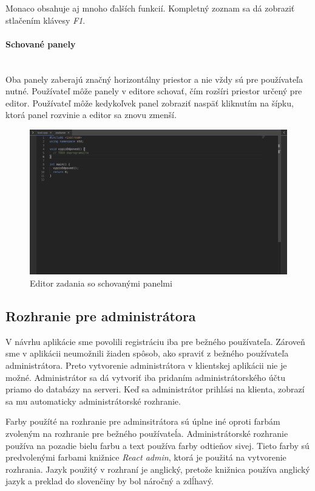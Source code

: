Monaco obsahuje aj mnoho ďalších funkcií. Kompletný zoznam sa dá zobraziť stlačením klávesy
\textit{F1}. 

\paragraph{Schované panely}\leavevmode\\
Oba panely zaberajú značný horizontálny priestor a nie vždy sú pre používateľa nutné. Používateľ
môže panely v editore schovať, čím rozšíri priestor určený pre editor. Používateľ môže kedykoľvek
panel zobraziť naspäť kliknutím na šípku, ktorá panel rozvinie a editor sa znovu zmenší. 
\begin{figure}[H]
\centerline{\includegraphics[width=1\textwidth]{images/zcucnute_panely}}
\caption[Editor zadania so schovanými panelmi]{Editor zadania so schovanými panelmi}
\label{obr:zcucnute_panely}
\end{figure}

\subsection{Rozhranie pre administrátora}
V návrhu aplikácie sme povolili registráciu iba pre bežného používateľa. Zároveň sme v aplikácii
neumožnili žiaden spôsob, ako spraviť z bežného používateľa administrátora. Preto vytvorenie
administrátora v klientskej aplikácii nie je možné. Administrátor sa dá vytvoriť iba pridaním
administrátorského účtu priamo do databázy na serveri. Keď sa administrátor prihlási na klienta,
zobrazí sa mu automaticky administrátorské rozhranie.

Farby použíté na rozhranie pre adminsitrátora sú úplne iné oproti farbám zvoleným na rozhranie pre
bežného používateĺa. Administrátorské rozhranie používa na pozadie bielu farbu a text používa farby
odtieňov sivej. Tieto farby sú predvolenými farbami knižnice \textit{React admin}, ktorá je použitá
na vytvorenie rozhrania. Jazyk použitý v rozhraní je anglický, pretože knižnica používa anglický
jazyk a preklad do slovenčiny by bol náročný a zdĺhavý.

